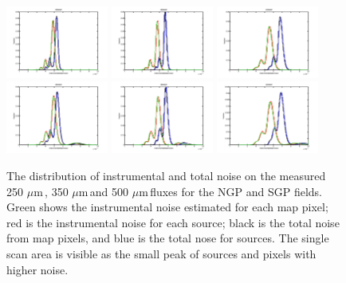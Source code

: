 \documentclass[useAMS,usenatbib]{mn2e}
\def\mic{ $\mu $m\,}
\begin{document}
\begin{figure} %
\includegraphics[width=0.3\textwidth]{flux_noise_250NGP.pdf}
\includegraphics[width=0.3\textwidth]{flux_noise_350NGP.pdf}
\includegraphics[width=0.3\textwidth]{flux_noise_500NGP.pdf}
\includegraphics[width=0.3\textwidth]{flux_noise_250SGP.pdf}
\includegraphics[width=0.3\textwidth]{flux_noise_350SGP.pdf}
\includegraphics[width=0.3\textwidth]{flux_noise_500SGP.pdf}
\caption{The distribution of instrumental and total noise on the
  measured 250\mic, 350\mic and 500\mic fluxes for the NGP and SGP fields.
  Green shows the instrumental noise estimated for each map pixel; red is
  the instrumental noise for each source; black is the total noise
  from map pixels, and blue is the total nose for sources. 
The single scan area is visible as the small peak of sources and
pixels with higher noise. }
\label{fig_noises}
\end{figure}
\end{document}

